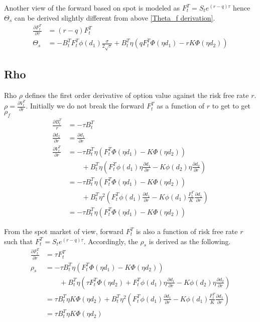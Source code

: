 \documentclass{article}
\begin{document}
Another view of the forward based on spot is modeled as $ F_t^T = S_t e^{(r - q) \tau} $ hence $ \Theta_s $ can be derived slightly different from above \ref{Theta_f derivation}.
\begin{align} \label{Theta_s derivation}
    \frac{\partial F_t^T}{\partial \tau} &= (r - q) F_t^T \nonumber \\
    \Theta_s &= -B_t^T F_t^T \phi(d_1) \frac{\sigma}{2 \sqrt{\tau}} + B_t^T \eta \left(q F_t^T \Phi(\eta d_1) - r K \Phi(\eta d_2) \right)
\end{align}

\subsection{Rho}

Rho $ \rho $ defines the first order derivative of option value against the risk free rate $ r $.
$ \rho = \frac{\partial V_t^T}{\partial r} $.
Initially we do not break the forward $ F_t^T $ as a function of $ r $ to get  to get $ \rho_f $
\begin{align} \label{rho_f derivation}
    \frac{\partial B_t^T}{r} &= -\tau B_t^T \nonumber \\
    \frac{\partial d_2}{\partial r} &= \frac{\partial d_1}{\partial r} \nonumber \\
    \frac{\partial V_t^T}{\partial r} &= -\tau B_t^T \eta \left(F_t^T \Phi(\eta d_1) - K \Phi(\eta d_2)\right) \nonumber \\
    &\quad \quad + B_t^T \eta \left(F_t^T \phi(d_1) \eta \frac{\partial d_1}{\partial r} - K \phi(d_2) \eta \frac{\partial d_2}{\partial r}\right) \nonumber \\
    &= -\tau B_t^T \eta \left(F_t^T \Phi(\eta d_1) - K \Phi(\eta d_2)\right) \nonumber \\
    &\quad \quad + B_t^T \eta^2 \left(F_t^T \phi(d_1) \frac{\partial d_1}{\partial r} - K \phi(d_1) \frac{F_t^T}{K} \frac{\partial d_1}{\partial r}\right) \nonumber \\
    &= -\tau B_t^T \eta \left(F_t^T \Phi(\eta d_1) - K \Phi(\eta d_2)\right)
\end{align}

From the spot market of view, forward $ F_t^T $ is also a function of risk free rate $ r $ such that $ F_t^T = S_t e^{(r - q) \tau} $.
Accordingly, the $ \rho_s $ is derived as the following.
\begin{align} \label{rho_s derivation}
    \frac{\partial F_t^T}{\partial r} &= \tau F_t^T \nonumber \\
    \rho_s &= -\tau B_t^T \eta \left(F_t^T \Phi(\eta d_1) - K \Phi(\eta d_2) \right) \nonumber \\
    &\quad \quad + B_t^T \eta \left(\tau F_t^T \Phi(\eta d_2) + F_t^T \phi(d_1) \eta \frac{\partial d_1}{\partial r} - K \phi(d_2) \eta \frac{\partial d_2}{\partial r} \right) \nonumber \\
    &= \tau B_t^T \eta K \Phi(\eta d_2) + B_t^T \eta^2 \left(F_t^T \phi(d_1) \frac{\partial d_1}{\partial r} - K \phi(d_1) \frac{F_t^T}{K} \frac{\partial d_1}{\partial r} \right) \nonumber \\
    &= \tau B_t^T \eta K \Phi(\eta d_2)
\end{align}
\end{document}

